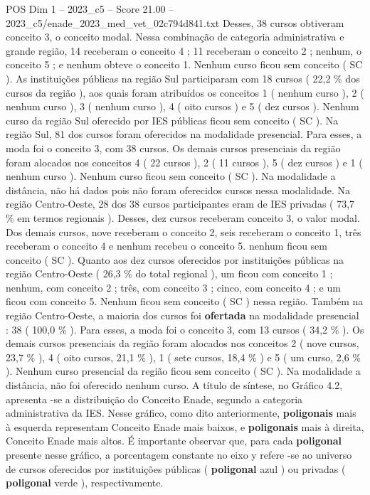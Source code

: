 \begin{textsample}{POS Dim 1 – 2023\_c5 – Score 21.00 – 2023\_c5/enade\_2023\_med\_vet\_02c794d841.txt}
Desses, 38 cursos obtiveram conceito 3, o conceito modal.
Nessa combinação de categoria administrativa e grande região, 14 receberam o conceito 4 ; 11 receberam o conceito 2 ; nenhum, o conceito 5 ; e nenhum obteve o conceito 1.
Nenhum curso ficou sem conceito ( SC ).
As instituições públicas na região Sul participaram com 18 cursos ( 22,2 \% dos cursos da região ), aos quais foram atribuídos os conceitos 1 ( nenhum curso ), 2 ( nenhum curso ), 3 ( nenhum curso ), 4 ( oito cursos ) e 5 ( dez cursos ).
Nenhum curso da região Sul oferecido por IES públicas ficou sem conceito ( SC ).
Na região Sul, 81 dos cursos foram oferecidos na modalidade presencial.
Para esses, a moda foi o conceito 3, com 38 cursos.
Os demais cursos presenciais da região foram alocados nos conceitos 4 ( 22 cursos ), 2 ( 11 cursos ), 5 ( dez cursos ) e 1 ( nenhum curso ).
Nenhum curso ficou sem conceito ( SC ).
Na modalidade a distância, não há dados pois não foram oferecidos cursos nessa modalidade.
Na região Centro-Oeste, 28 dos 38 cursos participantes eram de IES privadas ( 73,7 \% em termos regionais ).
Desses, dez cursos receberam conceito 3, o valor modal.
Dos demais cursos, nove receberam o conceito 2, seis receberam o conceito 1, três receberam o conceito 4 e nenhum recebeu o conceito 5. nenhum ficou sem conceito ( SC ).
Quanto aos dez cursos oferecidos por instituições públicas na região Centro-Oeste ( 26,3 \% do total regional ), um ficou com conceito 1 ; nenhum, com conceito 2 ; três, com conceito 3 ; cinco, com conceito 4 ; e um ficou com conceito 5.
Nenhum ficou sem conceito ( SC ) nessa região.
Também na região Centro-Oeste, a maioria dos cursos foi \textbf{ofertada} na modalidade presencial : 38 ( 100,0 \% ).
Para esses, a moda foi o conceito 3, com 13 cursos ( 34,2 \% ).
Os demais cursos presenciais da região foram alocados nos conceitos 2 ( nove cursos, 23,7 \% ), 4 ( oito cursos, 21,1 \% ), 1 ( sete cursos, 18,4 \% ) e 5 ( um curso, 2,6 \% ).
Nenhum curso presencial da região ficou sem conceito ( SC ).
Na modalidade a distância, não foi oferecido nenhum curso.
A título de síntese, no Gráfico 4.2, apresenta -se a distribuição do Conceito Enade, segundo a categoria administrativa da IES.
Nesse gráfico, como dito anteriormente, \textbf{poligonais} mais à esquerda representam Conceito Enade mais baixos, e \textbf{poligonais} mais à direita, Conceito Enade mais altos.
É importante observar que, para cada \textbf{poligonal} presente nesse gráfico, a porcentagem constante no eixo y refere -se ao universo de cursos oferecidos por instituições públicas ( \textbf{poligonal} azul ) ou privadas ( \textbf{poligonal} verde ), respectivamente.

\end{textsample}
